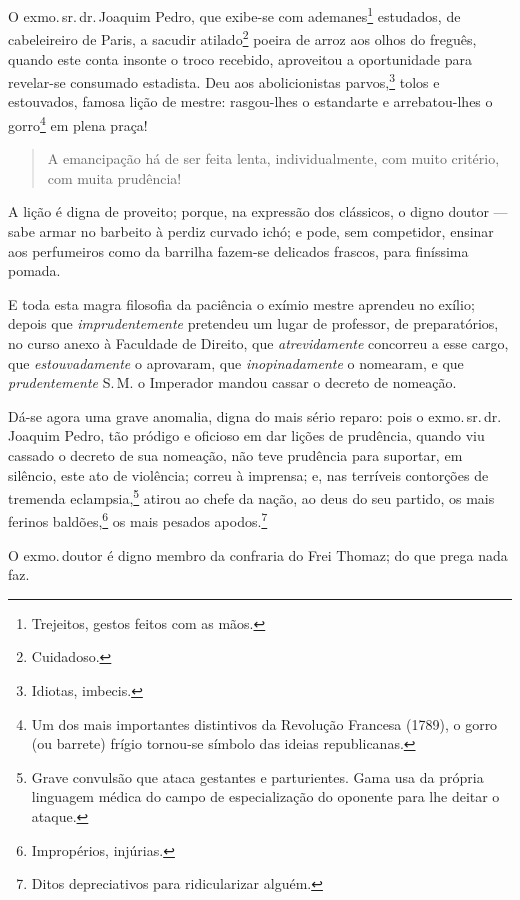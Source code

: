 {
O exmo.\,sr.\,dr.\,Joaquim Pedro, que exibe-se com ademanes\footnote{
  Trejeitos, gestos feitos com as mãos.} estudados, de cabeleireiro de
Paris, a sacudir atilado\footnote{Cuidadoso.} poeira de arroz aos
olhos do freguês, quando este conta insonte o troco recebido, aproveitou
a oportunidade para revelar-se consumado estadista. Deu aos
abolicionistas parvos,\footnote{Idiotas, imbecis.} tolos e estouvados,
famosa lição de mestre: rasgou-lhes o estandarte e arrebatou-lhes o
gorro\footnote{Um dos mais importantes distintivos da Revolução
  Francesa (1789), o gorro (ou barrete) frígio tornou-se símbolo das
  ideias republicanas.} em plena praça!

\begin{quote}
A emancipação há de ser feita lenta, individualmente, com muito
critério, com muita prudência!
\end{quote}

A lição é digna de proveito; porque, na expressão dos clássicos, o digno
doutor --- sabe armar no barbeito à perdiz curvado ichó; e pode, sem
competidor, ensinar aos perfumeiros como da barrilha fazem-se delicados
frascos, para finíssima pomada.

E toda esta magra filosofia da paciência o exímio mestre aprendeu no
exílio; depois que \emph{imprudentemente} pretendeu um lugar de
professor, de preparatórios, no curso anexo à Faculdade de Direito, que
\emph{atrevidamente} concorreu a esse cargo, que \emph{estouvadamente} o
aprovaram, que \emph{inopinadamente} o nomearam, e que
\emph{prudentemente} S.\,M. o Imperador mandou cassar o decreto de
nomeação.

Dá-se agora uma grave anomalia, digna do mais sério reparo: pois o exmo.\,sr.\,dr.\,Joaquim Pedro, tão pródigo e oficioso em dar lições de
prudência, quando viu cassado o decreto de sua nomeação, não teve
prudência para suportar, em silêncio, este ato de violência; correu à
imprensa; e, nas terríveis contorções de tremenda eclampsia,\footnote{
  Grave convulsão que ataca gestantes e parturientes. Gama usa da
  própria linguagem médica do campo de especialização do oponente para
  lhe deitar o ataque.} atirou ao chefe da nação, ao deus do seu
partido, os mais ferinos baldões,\footnote{Impropérios, injúrias.} os
mais pesados apodos.\footnote{Ditos depreciativos para ridicularizar
  alguém.}

O exmo.\,doutor é digno membro da confraria do Frei Thomaz; do que prega
nada faz.

}
